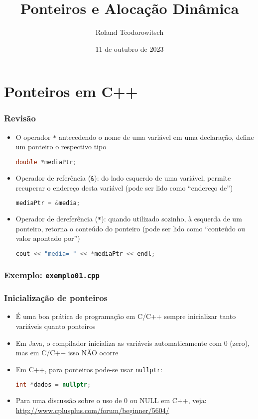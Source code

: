 \documentclass[aspectratio=169]{beamer}
\title[\sc{Ponteiros e Alocação Dinâmica}]{Ponteiros e Alocação Dinâmica}
\author[Roland Teodorowitsch]{Roland Teodorowitsch}
\institute[POO - EC - PUCRS]{Programação Orientada a Objetos - ECo - Curso de Engenharia de Computação - PUCRS}
\date{11 de outubro de 2023}
\begin{document}
\justifying

\begin{frame}
	\titlepage
\end{frame}

\section{Ponteiros em C++}

\begin{frame}[fragile]\frametitle{Revisão}
\begin{itemize}
	\item O operador \texttt{*} antecedendo o nome de uma variável em uma declaração, define um ponteiro o respectivo tipo
\begin{lstlisting}[language=C++]
double *mediaPtr;
\end{lstlisting}
	\item Operador de referência (\texttt{\&}): do lado esquerdo de uma variável, permite recuperar o endereço desta variável (pode ser lido como ``endereço de'')
\begin{lstlisting}[language=C++]
mediaPtr = &media;
\end{lstlisting}
	\item Operador de dereferência (\texttt{*}): quando utilizado sozinho, à esquerda de um ponteiro, retorna o conteúdo do ponteiro (pode ser lido como ``conteúdo ou valor apontado por'')
\begin{lstlisting}[language=C++]
cout << "media= " << *mediaPtr << endl;
\end{lstlisting}
\end{itemize}
\end{frame}

\begin{frame}[fragile]\frametitle{Exemplo: \texttt{exemplo01.cpp}}

\end{frame}

\begin{frame}[fragile]\frametitle{Inicialização de ponteiros}
\begin{itemize}
	\item É uma boa prática de programação em C/C++ sempre inicializar tanto variáveis quanto ponteiros
	\item Em Java, o compilador inicializa as variáveis automaticamente com 0 (zero), mas em C/C++ isso NÃO ocorre
	\item Em C++, para ponteiros pode-se usar \texttt{nullptr}:
\begin{lstlisting}[language=C++]
int *dados = nullptr;
\end{lstlisting}
	\item Para uma discussão sobre o uso de 0 ou NULL em C++, veja: \url{http://www.cplusplus.com/forum/beginner/5604/}
\end{itemize}
\end{frame}
\end{document}
